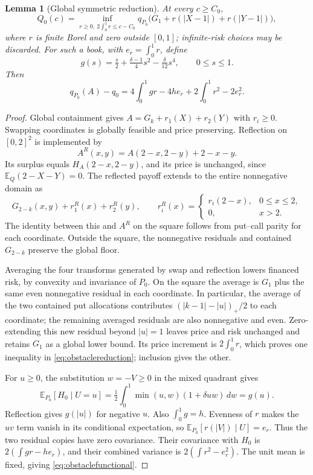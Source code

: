 \documentclass[11pt,a4paper]{amsart}
\theoremstyle{plain}
\newtheorem{lemma}[theorem]{Lemma}
\theoremstyle{definition}
\theoremstyle{remark}
\newcommand{\EE}{\mathbb{E}}
\begin{document}
\begin{lemma}[Global symmetric reduction]\label{lem:obstacle}
At every $c\ge C_0$,
\begin{equation}\label{eq:obstaclereduction}
 Q_0(c)=\inf_{r\ge0,\ 2\int_0^1r\le c-C_0}
 q_{P_0}\bigl(G_1+r(|X-1|)+r(|Y-1|)\bigr),
\end{equation}
where $r$ is finite Borel and zero outside $[0,1]$; infinite-risk choices may be discarded. For such a book, with $e_r=\int_0^1r$, define
\begin{equation}\label{eq:gprofile}
 g(s)=\tfrac s2+\tfrac{\delta-1}{4}s^2-\tfrac\delta{12}s^4,
 \qquad 0\le s\le1.
\end{equation}
Then
\begin{equation}\label{eq:obstaclefunctional}
 q_{P_0}(A)-q_0
 =4\int_0^1gr-4he_r+2\int_0^1r^2-2e_r^2.
\end{equation}
\end{lemma}
\begin{proof}
Global containment gives $A=G_k+r_1(X)+r_2(Y)$ with $r_i\ge0$. Swapping coordinates is globally feasible and price preserving. Reflection on $[0,2]^2$ is implemented by
\[
 A^R(x,y)=A(2-x,2-y)+2-x-y.
\]
Its surplus equals $H_A(2-x,2-y)$, and its price is unchanged, since $\EE_Q(2-X-Y)=0$. The reflected payoff extends to the entire nonnegative domain as
\[
 G_{2-k}(x,y)+r_1^R(x)+r_2^R(y),\qquad
 r_i^R(x)=
 \begin{cases}r_i(2-x),&0\le x\le2,\\0,&x>2.
 \end{cases}
\]
The identity between this and $A^R$ on the square follows from put--call parity for each coordinate. Outside the square, the nonnegative residuals and contained $G_{2-k}$ preserve the global floor.

Averaging the four transforms generated by swap and reflection lowers financed risk, by convexity and invariance of $P_0$. On the square the average is $G_1$ plus the same even nonnegative residual in each coordinate. In particular, the average of the two contained put allocations contributes $(|k-1|-|u|)_+/2$ to each coordinate; the remaining averaged residuals are also nonnegative and even. Zero-extending this new residual beyond $|u|=1$ leaves price and risk unchanged and retains $G_1$ as a global lower bound. Its price increment is $2\int_0^1r$, which proves one inequality in \eqref{eq:obstaclereduction}; inclusion gives the other.

For $u\ge0$, the substitution $w=-V\ge0$ in the mixed quadrant gives
\[
 \EE_{P_0}[H_0\mid U=u]
 =\tfrac12\int_0^1\min(u,w)(1+\delta uw)\,dw=g(u).
\]
Reflection gives $g(|u|)$ for negative $u$. Also $\int_0^1g=h$. Evenness of $r$ makes the $uv$ term vanish in its conditional expectation, so $\EE_{P_0}[r(|V|)\mid U]=e_r$. Thus the two residual copies have zero covariance. Their covariance with $H_0$ is $2(\int gr-he_r)$, and their combined variance is $2(\int r^2-e_r^2)$. The unit mean is fixed, giving \eqref{eq:obstaclefunctional}.
\end{proof}
\end{document}
